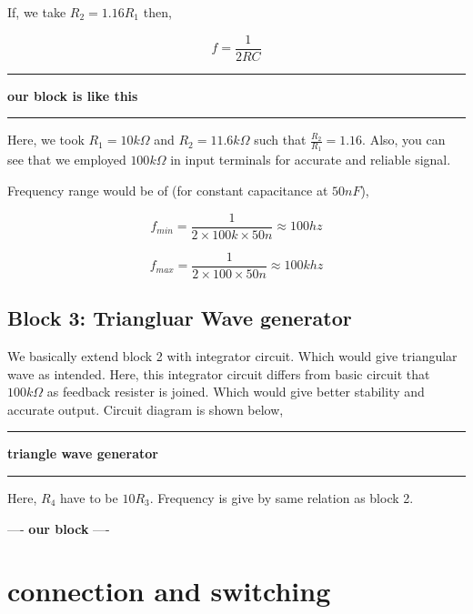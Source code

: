 \documentclass{article}
\begin{document}
If, we take \(R_{2}=1.16R_{1}\) then, 

\begin{equation}
\label{eq:orgcfc7115}
  f =\frac{1}{2RC}
\end{equation}

\noindent\rule{\textwidth}{0.5pt}
\textbf{\textbf{our block is like this}}

\noindent\rule{\textwidth}{0.5pt}

Here, we took \(R_{1} = 10k\Omega\) and \(R_{2} = 11.6k\Omega\) such that \(\frac{R_{2}}{R_{1}}=1.16\). Also, you can see that we employed \(100k\Omega\) in input terminals for accurate and reliable signal.

Frequency range would be of (for constant capacitance at \(50nF\)),

\begin{equation*}
\label{eq:org3e66f58}
  f_{min} =\frac{1}{2\times 100k\times 50n} \approx 100 hz
\end{equation*}

\begin{equation*}
\label{eq:orge1fa0a5}
  f_{max} =\frac{1}{2\times 100 \times 50n} \approx 100 khz
\end{equation*}


\subsection{Block 3: Triangluar Wave generator}
\label{sec:orge83d86a}

We basically extend block 2 with integrator circuit. Which would give triangular wave as intended. Here, this integrator circuit differs from basic circuit that \(100k\Omega\) as feedback resister is joined. Which would give better stability and accurate output. Circuit diagram is shown below,

\noindent\rule{\textwidth}{0.5pt}
\textbf{\textbf{triangle wave generator}}

\noindent\rule{\textwidth}{0.5pt}

Here, \(R_{4}\) have to be \(10R_{3}\). Frequency is give by same relation as block 2.

----
\textbf{\textbf{our block}}
----




\section{connection and switching}
\label{sec:org310e328}
\end{document}
